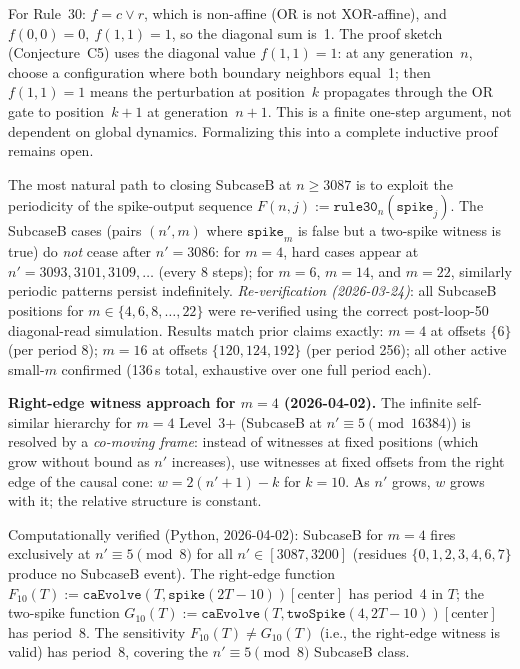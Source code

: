 \documentclass[11pt]{article}
\theoremstyle{plain}
\theoremstyle{definition}
\begin{document}
For Rule~30: $f = c \vee r$, which is non-affine (OR is not XOR-affine),
and $f(0,0) = 0,\ f(1,1) = 1$, so the diagonal sum is~1.  The proof sketch
(Conjecture~C5) uses the diagonal value $f(1,1) = 1$: at any generation~$n$, choose
a configuration where both boundary neighbors equal~1; then $f(1,1) = 1$ means the
perturbation at position~$k$ propagates through the OR gate to position~$k+1$
at generation~$n+1$.  This is a finite one-step argument, not dependent on global
dynamics.  Formalizing this into a complete inductive proof remains open.

The most natural path to closing SubcaseB at $n \geq 3087$ is to exploit the
periodicity of the spike-output sequence $F(n, j) := \mathtt{rule30}_n(\mathtt{spike}_j)$.
The SubcaseB cases (pairs $(n', m)$ where $\mathtt{spike}_m$ is false but a two-spike
witness is true) do \emph{not} cease after $n' = 3086$: for $m = 4$, hard cases
appear at $n' = 3093, 3101, 3109, \ldots$ (every 8 steps); for $m = 6$, $m = 14$,
and $m = 22$, similarly periodic patterns persist indefinitely.
\emph{Re-verification (2026-03-24)}: all SubcaseB positions for $m \in \{4,6,8,\ldots,22\}$
were re-verified using the correct post-loop-50 diagonal-read simulation.
Results match prior claims exactly: $m=4$ at offsets $\{6\}$ (per period 8);
$m=16$ at offsets $\{120,124,192\}$ (per period 256); all other active small-$m$
confirmed (136\,s total, exhaustive over one full period each).

\textbf{Right-edge witness approach for $m=4$ (2026-04-02).}
The infinite self-similar hierarchy for $m=4$ Level~3+ (SubcaseB at $n' \equiv 5 \pmod{16384}$) is resolved by a \emph{co-moving frame}: instead of witnesses at fixed positions (which grow without bound as $n'$ increases), use witnesses at fixed offsets from the right edge of the causal cone: $w = 2(n'+1) - k$ for $k = 10$. As $n'$ grows, $w$ grows with it; the relative structure is constant.

Computationally verified (Python, 2026-04-02): SubcaseB for $m=4$ fires exclusively at $n' \equiv 5 \pmod 8$ for all $n' \in [3087, 3200]$ (residues $\{0,1,2,3,4,6,7\}$ produce no SubcaseB event). The right-edge function $F_{10}(T) := \mathtt{caEvolve}(T, \mathtt{spike}(2T{-}10))[\text{center}]$ has period~4 in $T$; the two-spike function $G_{10}(T) := \mathtt{caEvolve}(T, \mathtt{twoSpike}(4, 2T{-}10))[\text{center}]$ has period~8. The sensitivity $F_{10}(T) \neq G_{10}(T)$ (i.e., the right-edge witness is valid) has period~8, covering the $n' \equiv 5 \pmod 8$ SubcaseB class.
\end{document}
